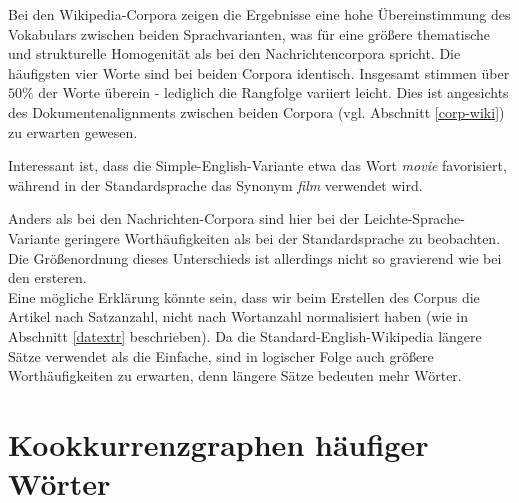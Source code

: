 \documentclass[11pt, a4paper]{article}
\begin{document}
Bei den Wikipedia-Corpora zeigen die Ergebnisse eine hohe Übereinstimmung des
Vokabulars zwischen beiden Sprachvarianten, was für eine größere thematische
und strukturelle Homogenität als bei den Nachrichtencorpora spricht.
Die häufigsten vier Worte sind bei beiden Corpora identisch.
Insgesamt stimmen über $50\%$ der Worte überein - lediglich die Rangfolge
variiert leicht.
Dies ist angesichts des Dokumentenalignments zwischen beiden Corpora (vgl.
Abschnitt \ref{corp-wiki}) zu erwarten gewesen.

Interessant ist, dass die Simple-English-Variante etwa das Wort \textit{movie}
favorisiert, während in der Standardsprache das Synonym \textit{film} verwendet
wird.

Anders als bei den Nachrichten-Corpora sind hier bei der Leichte-Sprache-Variante
geringere Worthäufigkeiten als bei der Standardsprache zu beobachten.
Die Größenordnung dieses Unterschieds ist allerdings nicht so gravierend wie bei
den ersteren.\\
Eine mögliche Erklärung könnte sein, dass wir beim Erstellen des Corpus die
Artikel nach Satzanzahl, nicht nach Wortanzahl normalisiert haben (wie in
Abschnitt \ref{datextr} beschrieben).
Da die Standard-English-Wikipedia längere Sätze verwendet als die Einfache,
sind in logischer Folge auch größere Worthäufigkeiten zu erwarten, denn längere
Sätze bedeuten mehr Wörter.



\section{Kookkurrenzgraphen häufiger Wörter}
\end{document}

